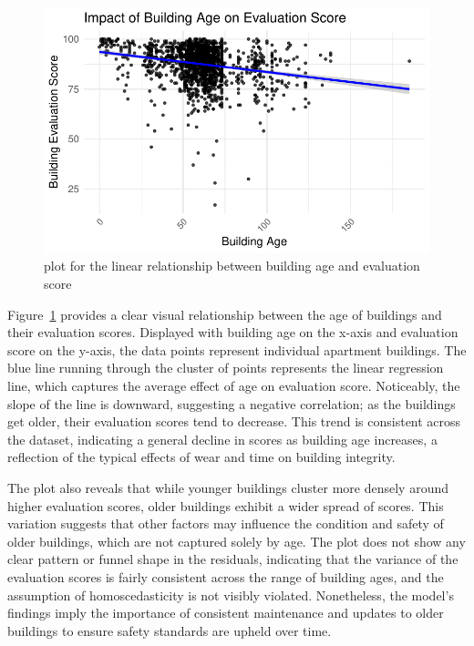 \documentclass[
  letterpaper,
  DIV=11,
  numbers=noendperiod]{scrartcl}
\begin{document}
\begin{figure}

{\centering \includegraphics{paper_files/figure-pdf/fig-linear-plot-1.pdf}

}

\caption{\label{fig-linear-plot}plot for the linear relationship between
building age and evaluation score}

\end{figure}

Figure~\ref{fig-linear-plot} provides a clear visual relationship
between the age of buildings and their evaluation scores. Displayed with
building age on the x-axis and evaluation score on the y-axis, the data
points represent individual apartment buildings. The blue line running
through the cluster of points represents the linear regression line,
which captures the average effect of age on evaluation score.
Noticeably, the slope of the line is downward, suggesting a negative
correlation; as the buildings get older, their evaluation scores tend to
decrease. This trend is consistent across the dataset, indicating a
general decline in scores as building age increases, a reflection of the
typical effects of wear and time on building integrity.

The plot also reveals that while younger buildings cluster more densely
around higher evaluation scores, older buildings exhibit a wider spread
of scores. This variation suggests that other factors may influence the
condition and safety of older buildings, which are not captured solely
by age. The plot does not show any clear pattern or funnel shape in the
residuals, indicating that the variance of the evaluation scores is
fairly consistent across the range of building ages, and the assumption
of homoscedasticity is not visibly violated. Nonetheless, the model's
findings imply the importance of consistent maintenance and updates to
older buildings to ensure safety standards are upheld over time.
\end{document}
